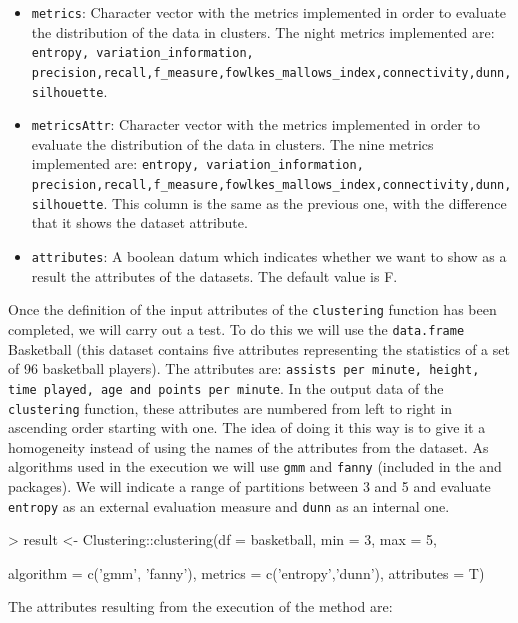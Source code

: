 \begin{itemize}
  \item \texttt{metrics}: Character vector with the metrics implemented in order to evaluate the distribution of the data in clusters. The night metrics implemented are: \texttt{entropy, variation\_information, precision,recall,f\_measure,fowlkes\_mallows\_index,connectivity,dunn,silhouette}.
  \item \texttt{metricsAttr}: Character vector with the metrics implemented in order to evaluate the distribution of the data in clusters. The nine metrics implemented are: \texttt{entropy, variation\_information, precision,recall,f\_measure,fowlkes\_mallows\_index,connectivity,dunn,silhouette}. This column is the same as the previous one, with the difference that it shows the dataset attribute.
  \item \texttt{attributes}: A boolean datum which indicates whether we want to show as a result the attributes of the datasets. The default value is F.
\end{itemize}
Once the definition of the input attributes of the \texttt{clustering} function has been completed, we will carry out a test. To do this we will use the \texttt{data.frame} Basketball (this dataset contains five attributes representing the statistics of a set of 96 basketball players). The attributes are: \texttt{assists per minute, height, time played, age and points per minute}. In the output data of the \texttt{clustering} function, these attributes are numbered from left to right in ascending order starting with one. The idea of doing it this way is to give it a homogeneity instead of using the names of the attributes from the dataset. As algorithms used in the execution we will use \texttt{gmm} and \texttt{fanny} (included in the  and  packages). We will indicate a range of partitions between 3 and 5 and evaluate \texttt{entropy} as an external evaluation measure and \texttt{dunn} as an internal one.

\begin{Schunk}
\begin{Sinput}
> result <- Clustering::clustering(df = basketball, min = 3, max = 5,
\end{Sinput}
\begin{Sinput}
      algorithm = c('gmm', 'fanny'), metrics = c('entropy','dunn'), attributes = T)
\end{Sinput}
\end{Schunk}
The attributes resulting from the execution of the method are:

